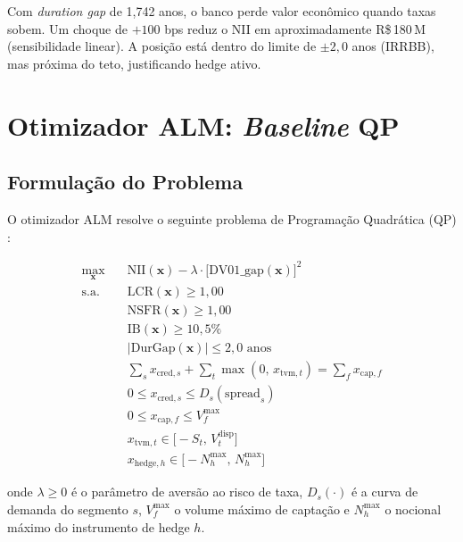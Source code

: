 \documentclass[12pt, a4paper, oneside]{article}
\begin{document}
\begin{warnbox}
Com \textit{duration gap} de 1,742 anos, o banco perde valor econômico
quando taxas sobem. Um choque de $+100$ bps reduz o NII em aproximadamente
R\$\,180\,M (sensibilidade linear). A posição está dentro do limite de
$\pm 2{,}0$ anos (IRRBB), mas próxima do teto, justificando hedge ativo.
\end{warnbox}

\section{Otimizador ALM: \textit{Baseline} QP}
\label{sec:optimizer}

\subsection{Formulação do Problema}

O otimizador ALM resolve o seguinte problema de Programação Quadrática (QP)
\citep{Nocedal2006}:

\begin{equation}
\begin{aligned}
  \max_{\mathbf{x}} \quad
    & \text{NII}(\mathbf{x})
      - \lambda \cdot \bigl[\text{DV01\_gap}(\mathbf{x})\bigr]^2 \\[6pt]
  \text{s.a.} \quad
    & \text{LCR}(\mathbf{x}) \geq 1{,}00 \\
    & \text{NSFR}(\mathbf{x}) \geq 1{,}00 \\
    & \text{IB}(\mathbf{x}) \geq 10{,}5\% \\
    & \bigl|\text{DurGap}(\mathbf{x})\bigr| \leq 2{,}0 \text{ anos} \\
    & \sum_s x_{\text{cred},s} + \sum_t \max(0,\,x_{\text{tvm},t})
        = \sum_f x_{\text{cap},f} \\
    & 0 \leq x_{\text{cred},s} \leq D_s(\text{spread}_s) \\
    & 0 \leq x_{\text{cap},f} \leq V_f^{\max} \\
    & x_{\text{tvm},t} \in \bigl[-S_t,\,V_t^{\text{disp}}\bigr] \\
    & x_{\text{hedge},h} \in \bigl[-N_h^{\max},\,N_h^{\max}\bigr]
\end{aligned}
\label{eq:qp}
\end{equation}

\noindent onde $\lambda \geq 0$ é o parâmetro de aversão ao risco de taxa,
$D_s(\cdot)$ é a curva de demanda do segmento $s$, $V_f^{\max}$ o volume
máximo de captação e $N_h^{\max}$ o nocional máximo do instrumento de hedge $h$.
\end{document}
